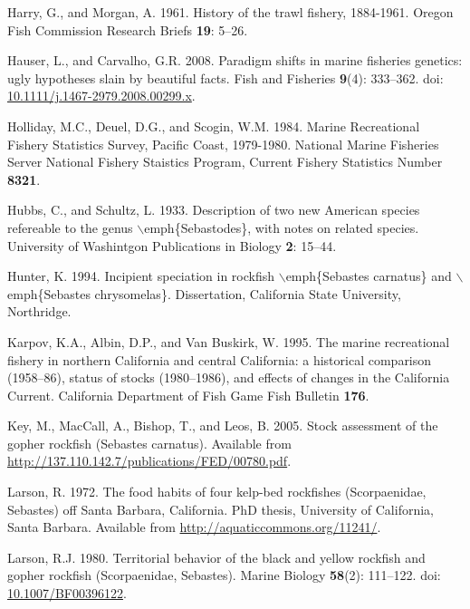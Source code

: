 \documentclass[12pt,]{article}
\begin{document}
\hypertarget{ref-Harry1961}{}
Harry, G., and Morgan, A. 1961. History of the trawl fishery, 1884-1961.
Oregon Fish Commission Research Briefs \textbf{19}: 5--26.

\hypertarget{ref-Hauser2008}{}
Hauser, L., and Carvalho, G.R. 2008. Paradigm shifts in marine fisheries
genetics: ugly hypotheses slain by beautiful facts. Fish and Fisheries
\textbf{9}(4): 333--362. doi:
\href{https://doi.org/10.1111/j.1467-2979.2008.00299.x}{10.1111/j.1467-2979.2008.00299.x}.

\hypertarget{ref-Holliday1984}{}
Holliday, M.C., Deuel, D.G., and Scogin, W.M. 1984. Marine Recreational
Fishery Statistics Survey, Pacific Coast, 1979-1980. National Marine
Fisheries Server National Fishery Staistics Program, Current Fishery
Statistics Number \textbf{8321}.

\hypertarget{ref-Hubbs1933}{}
Hubbs, C., and Schultz, L. 1933. Description of two new American species
refereable to the genus \(\backslash\)emph\{Sebastodes\}, with notes on
related species. University of Washintgon Publications in Biology
\textbf{2}: 15--44.

\hypertarget{ref-Hunter1994}{}
Hunter, K. 1994. Incipient speciation in rockfish
\(\backslash\)emph\{Sebastes carnatus\} and \(\backslash\)emph\{Sebastes
chrysomelas\}. Dissertation, California State University, Northridge.

\hypertarget{ref-Karpov1995}{}
Karpov, K.A., Albin, D.P., and Van Buskirk, W. 1995. The marine
recreational fishery in northern California and central California: a
historical comparison (1958--86), status of stocks (1980--1986), and
effects of changes in the California Current. California Department of
Fish Game Fish Bulletin \textbf{176}.

\hypertarget{ref-Key2005}{}
Key, M., MacCall, A., Bishop, T., and Leos, B. 2005. Stock assessment of
the gopher rockfish (Sebastes carnatus). Available from
\url{http://137.110.142.7/publications/FED/00780.pdf}.

\hypertarget{ref-Larson1972}{}
Larson, R. 1972. The food habits of four kelp-bed rockfishes
(Scorpaenidae, Sebastes) off Santa Barbara, California. PhD thesis,
University of California, Santa Barbara. Available from
\url{http://aquaticcommons.org/11241/}.

\hypertarget{ref-Larson1980}{}
Larson, R.J. 1980. Territorial behavior of the black and yellow rockfish
and gopher rockfish (Scorpaenidae, Sebastes). Marine Biology
\textbf{58}(2): 111--122. doi:
\href{https://doi.org/10.1007/BF00396122}{10.1007/BF00396122}.
\end{document}
